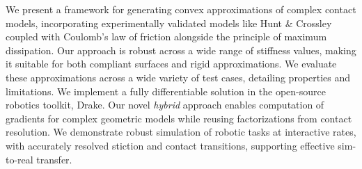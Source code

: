 We present a framework for generating convex approximations of complex contact
models, incorporating experimentally validated models like Hunt \& Crossley
coupled with Coulomb's law of friction alongside the principle of maximum
dissipation. Our approach is robust across a wide range of stiffness values,
making it suitable for both compliant surfaces and rigid approximations. We
evaluate these approximations across a wide variety of test cases, detailing
properties and limitations. We implement a fully differentiable solution in the
open-source robotics toolkit, Drake. Our novel \emph{hybrid} approach enables
computation of gradients for complex geometric models while reusing
factorizations from contact resolution. We demonstrate robust simulation of
robotic tasks at interactive rates, with accurately resolved stiction and
contact transitions, supporting effective sim-to-real transfer.
